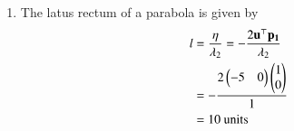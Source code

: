 \documentclass[journal,12pt,twocolumn]{IEEEtran}
\renewcommand{\vec}[1]{\boldsymbol{\mathbf{#1}}}
\begin{document}
\begin{enumerate}
\item The latus rectum of a parabola is given by 
\begin{align}
	l &= \frac{\eta}{\lambda_2}  
	 = -\frac{2\vec{u}^\top\vec{p_1}}{\lambda_2} \\
	 &= -\frac{2\myvec{-5 & 0}\myvec{1 \\ 0}}{1} \\
	 &= 10 \text{ units }
\end{align}
\end{enumerate}
\end{document}

